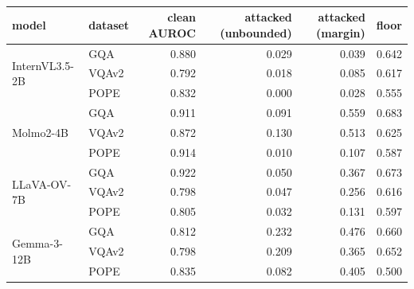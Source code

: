 \vspace{8pt}
\\[2pt]
\small
\setlength{\tabcolsep}{6pt}
\begin{tabular}{@{}llrrrr@{}}
\toprule
model & dataset & clean AUROC & attacked (unbounded) & attacked (margin) & floor \\
\midrule
\multirow{3}{*}{InternVL3.5-2B} & GQA & 0.880 & 0.029 & 0.039 & 0.642 \\
 & VQAv2 & 0.792 & 0.018 & 0.085 & 0.617 \\
 & POPE & 0.832 & 0.000 & 0.028 & 0.555 \\
\midrule
\multirow{3}{*}{Molmo2-4B} & GQA & 0.911 & 0.091 & 0.559 & 0.683 \\
 & VQAv2 & 0.872 & 0.130 & 0.513 & 0.625 \\
 & POPE & 0.914 & 0.010 & 0.107 & 0.587 \\
\midrule
\multirow{3}{*}{LLaVA-OV-7B} & GQA & 0.922 & 0.050 & 0.367 & 0.673 \\
 & VQAv2 & 0.798 & 0.047 & 0.256 & 0.616 \\
 & POPE & 0.805 & 0.032 & 0.131 & 0.597 \\
\midrule
\multirow{3}{*}{Gemma-3-12B} & GQA & 0.812 & 0.232 & 0.476 & 0.660 \\
 & VQAv2 & 0.798 & 0.209 & 0.365 & 0.652 \\
 & POPE & 0.835 & 0.082 & 0.405 & 0.500 \\
\bottomrule
\end{tabular}

\vspace{3pt}
